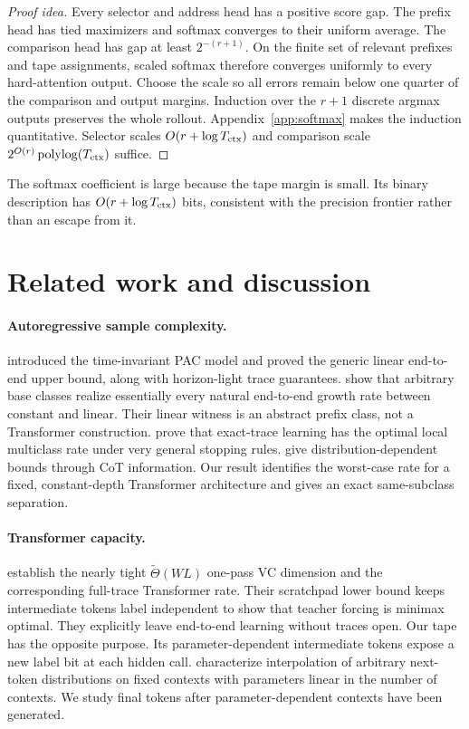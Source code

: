\documentclass{article}
\newcommand{\1}{\mathbf 1}
\begin{document}
\begin{proof}[Proof idea]
Every selector and address head has a positive score gap. The prefix head has tied maximizers and softmax converges to their uniform average. The comparison head has gap at least $2^{-(r+1)}$. On the finite set of relevant prefixes and tape assignments, scaled softmax therefore converges uniformly to every hard-attention output. Choose the scale so all errors remain below one quarter of the comparison and output margins. Induction over the $r+1$ discrete argmax outputs preserves the whole rollout. Appendix~\ref{app:softmax} makes the induction quantitative. Selector scales $O(r+\log T_{\rm ctx})$ and comparison scale $2^{O(r)}\operatorname{polylog}(T_{\rm ctx})$ suffice.
\end{proof}

The softmax coefficient is large because the tape margin is small. Its binary description has $O(r+\log T_{\rm ctx})$ bits, consistent with the precision frontier rather than an escape from it.

\section{Related work and discussion}

\paragraph{Autoregressive sample complexity.}
\citet{joshi2025theory} introduced the time-invariant PAC model and proved the generic linear end-to-end upper bound, along with horizon-light trace guarantees. \citet{hanneke2026sample} show that arbitrary base classes realize essentially every natural end-to-end growth rate between constant and linear. Their linear witness is an abstract prefix class, not a Transformer construction. \citet{li2026optimal} prove that exact-trace learning has the optimal local multiclass rate under very general stopping rules. \citet{altabaa2025cot} give distribution-dependent bounds through CoT information. Our result identifies the worst-case rate for a fixed, constant-depth Transformer architecture and gives an exact same-subclass separation.

\paragraph{Transformer capacity.}
\citet{yang2026tight} establish the nearly tight $\widetilde\Theta(WL)$ one-pass VC dimension and the corresponding full-trace Transformer rate. Their scratchpad lower bound keeps intermediate tokens label independent to show that teacher forcing is minimax optimal. They explicitly leave end-to-end learning without traces open. Our tape has the opposite purpose. Its parameter-dependent intermediate tokens expose a new label bit at each hidden call. \citet{madden2025next} characterize interpolation of arbitrary next-token distributions on fixed contexts with parameters linear in the number of contexts. We study final tokens after parameter-dependent contexts have been generated.
\end{document}
